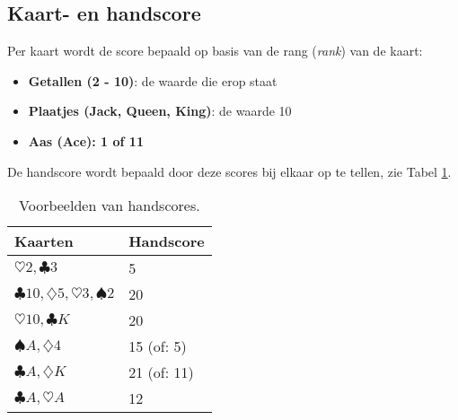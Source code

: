 

\subsection{Kaart- en handscore}
Per kaart wordt de score bepaald op basis van de rang (\textit{rank}) van de kaart:

\begin{itemize}
    \item \textbf{Getallen (2 - 10)}: de waarde die erop staat
    \item \textbf{Plaatjes (Jack, Queen, King)}: de waarde 10
    \item \textbf{Aas (Ace): 1 of 11}
\end{itemize}

De handscore wordt bepaald door deze scores bij elkaar op te tellen, 
zie Tabel \ref{table:handscores}.

\begin{table}[H]
    \centering
    \begin{tabularx}{0.4\textwidth}{|l|X|}
        \hline
        \textbf{Kaarten} & \textbf{Handscore} \\ \hline
        $\heartsuit 2, \clubsuit 3$ & 5 \\ \hline
        $\clubsuit 10, \diamondsuit 5, \heartsuit 3, \spadesuit2$ & 20 \\ \hline
        $\heartsuit 10, \clubsuit K$  & 20                 \\ \hline
        $\spadesuit A, \diamondsuit 4$ & 15 (of: 5)         \\ \hline
        $\clubsuit A, \diamondsuit K$ & 21 (of: 11)         \\ \hline
        $\clubsuit A, \heartsuit A$ & 12                 \\ \hline
    \end{tabularx}
    \caption{Voorbeelden van handscores.}
    \label{table:handscores}
    \centering
\end{table}

